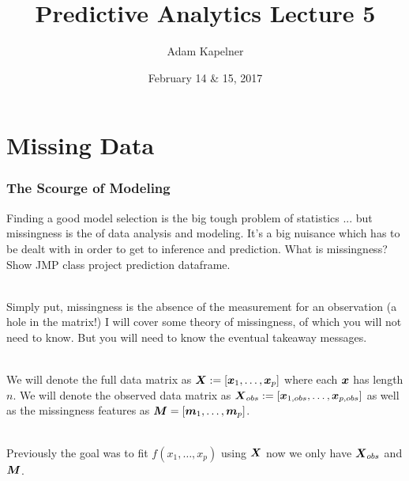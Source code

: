 \documentclass[handout]{beamer}
\title[Lecture]{Predictive Analytics Lecture 5}
\institute[Wharton, Statistics]{Stat 422/722\\ at The Wharton School of the University of Pennsylvania}
\date{February 14 \& 15, 2017}
\author{Adam Kapelner}
\begin{document}
\frame{\titlepage}

\section{Missing Data}


\begin{frame}\frametitle{The Scourge of Modeling}
\small
Finding a good model selection is the big tough problem of statistics ... but missingness is the  of data analysis and modeling. It's a big nuisance which has to be dealt with in order to get to inference and prediction. What is missingness? \pause Show JMP class project prediction dataframe. \\~\\ \pause

Simply put, missingness is the absence of the measurement for an observation (a hole in the matrix!) I will cover some theory of missingness, of which you will not need to know. But you will need to know the eventual takeaway messages. \\~\\ \pause

We will denote the full data matrix as $\boldsymbol{X} := \left[\boldsymbol{x}_1, \ldots, \boldsymbol{x}_p\right]$ where each $\boldsymbol{x}$ has length $n$. We will denote the observed data matrix as $\boldsymbol{X}_{obs} := \left[\boldsymbol{x}_{1,obs}, \ldots, \boldsymbol{x}_{p,obs}\right]$ as well as the missingness features as $\boldsymbol{M} = \left[\boldsymbol{m}_1, \ldots, \boldsymbol{m}_p\right]$. \\~\\ \pause

Previously the goal was to fit $f(x_1,\ldots, x_p)$ using $\boldsymbol{X}$ now we only have $\boldsymbol{X}_{obs}$ and $\boldsymbol{M}$.

	
\end{frame}
\end{document}
